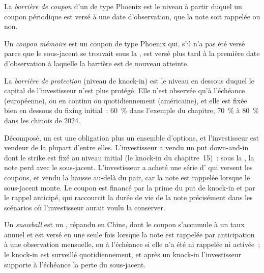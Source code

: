 \begin{definition}\label{def:dv:autocallables:couponbarrier}
La \emph{barrière de coupon} d'un  de type Phoenix est le niveau à partir duquel un coupon périodique est
versé à une date d'observation, que la note soit rappelée ou non.
\end{definition}

\begin{definition}\label{def:dv:autocallables:memory}
Un \emph{coupon mémoire} est un coupon de type Phoenix qui, s'il n'a pas été versé parce que le sous-jacent se trouvait sous la
, est versé plus tard à la première date d'observation à laquelle la barrière est de nouveau atteinte.
\end{definition}

\begin{definition}\label{def:dv:autocallables:protection}
La \emph{barrière de protection} (niveau de knock-in) est le niveau en dessous duquel le capital de l'investisseur
n'est plus protégé. Elle n'est observée qu'à l'échéance (européenne), ou en continu ou quotidiennement (américaine), et elle est fixée bien en dessous
du fixing initial~: 60~\% dans l'exemple du chapitre, 70~\% à 80~\% dans les  chinois de 2024.
\end{definition}

Décomposé, un  est une obligation plus un ensemble d'options, et l'investisseur est vendeur de la plupart d'entre elles. L'investisseur a vendu
un put down-and-in dont le strike est fixé au niveau initial (le knock-in du chapitre~15)~: sous la , la note perd avec le
sous-jacent. L'investisseur a acheté une série d' qui versent les coupons, et vendu la hausse au-delà du pair, car
la note est rappelée lorsque le sous-jacent monte. Le coupon est financé par la prime du put de knock-in et par le
rappel anticipé, qui raccourcit la durée de vie de la note précisément dans les scénarios où l'investisseur aurait voulu la conserver.

\begin{definition}[Snowball]\label{def:dv:autocallables:snowball}
Un \emph{snowball} est un , répandu en Chine, dont le coupon s'accumule à un taux annuel et est versé en une
seule fois lorsque la note est rappelée par anticipation à une observation mensuelle, ou à l'échéance si elle n'a été ni rappelée ni activée~;
le knock-in est surveillé quotidiennement, et après un knock-in l'investisseur supporte à l'échéance la perte du sous-jacent.
\end{definition}

